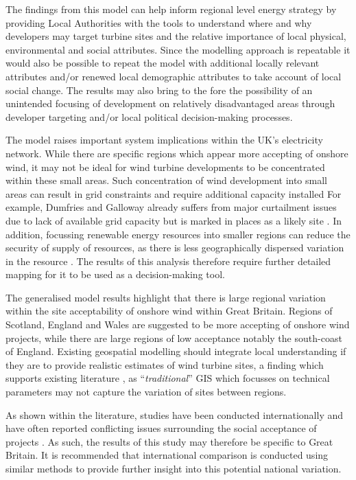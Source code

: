 \documentclass[a4paper,]{article}
\theoremstyle{definition}
\theoremstyle{definition}
\theoremstyle{definition}
\theoremstyle{remark}
\begin{document}
The findings from this model can help inform regional level energy strategy by providing Local Authorities with the tools to understand where and why developers may target turbine sites and the relative importance of local physical, environmental and social attributes. Since the modelling approach is repeatable it would also be possible to repeat the model with additional locally relevant attributes and/or renewed local demographic attributes to take account of local social change. The results may also bring to the fore the possibility of an unintended focusing of development on relatively disadvantaged areas through developer targeting and/or local political decision-making processes.

The model raises important system implications within the UK's electricity network. While there are specific regions which appear more accepting of onshore wind, it may not be ideal for wind turbine developments to be concentrated within these small areas. Such concentration of wind development into small areas can result in grid constraints and require additional capacity installed \citep{alexander2014energy} For example, Dumfries and Galloway already suffers from major curtailment issues due to lack of available grid capacity but is marked in places as a likely site \citep{DECC2016}. In addition, focussing renewable energy resources into smaller regions can reduce the security of supply of resources, as there is less geographically dispersed variation in the resource \citep{ENGELAND2017600}. The results of this analysis therefore require further detailed mapping for it to be used as a decision-making tool.

The generalised model results highlight that there is large regional variation within the site acceptability of onshore wind within Great Britain. Regions of Scotland, England and Wales are suggested to be more accepting of onshore wind projects, while there are large regions of low acceptance notably the south-coast of England. Existing geospatial modelling should integrate local understanding if they are to provide realistic estimates of wind turbine sites, a finding which supports existing literature \citep{Langer2016, Roddis2018}, as ``\emph{traditional}'' GIS which focusses on technical parameters may not capture the variation of sites between regions.

As shown within the literature, studies have been conducted internationally and have often reported conflicting issues surrounding the social acceptance of projects \citep{Scherhaufer2017, Warren2010}. As such, the results of this study may therefore be specific to Great Britain. It is recommended that international comparison is conducted using similar methods to provide further insight into this potential national variation.
\end{document}
